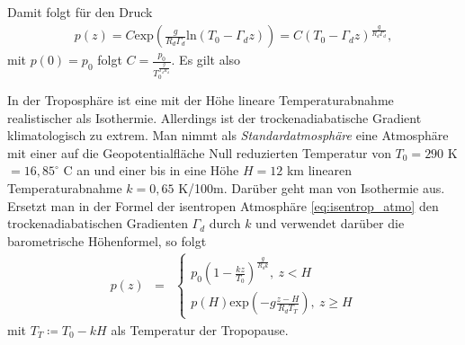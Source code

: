 \documentclass{book}
\renewcommand{\exp}{\text{exp}}
\renewcommand{\ln}{\text{ln}}
\begin{document}
%
Damit folgt für den Druck
%
\begin{eqnarray}
p(z) = C\exp\left(\frac{g}{R_d\Gamma_d}\ln\left(T_0 - \Gamma_d z\right)\right) = C\left(T_0 - \Gamma_d z\right)^{\frac{g}{R_d\Gamma_d}}, 
\end{eqnarray}
%
mit $p(0) = p_0$ folgt $C = \frac{p_0}{T_0^{\frac{g}{\Gamma_d R_d}}}$. Es gilt also
%
\begin{center}
\end{center}
%
In der Troposphäre ist eine mit der Höhe lineare Temperaturabnahme realistischer als Isothermie. Allerdings ist der trockenadiabatische Gradient klimatologisch zu extrem. Man nimmt als \textit{Standardatmosphäre} eine Atmosphäre mit einer auf die Geopotentialfläche Null reduzierten Temperatur von $T_0 = 290$ K $ = 16, 85^\circ$ C an und einer bis in eine Höhe $H = 12$ km linearen Temperaturabnahme $k = 0, 65$ K/100m. Darüber geht man von Isothermie aus. Ersetzt man in der Formel der isentropen Atmosphäre \eqref{eq:isentrop_atmo} den trockenadiabatischen Gradienten $\Gamma_d$ durch $k$ und verwendet darüber die barometrische Höhenformel, so folgt
%
\begin{eqnarray}
p(z) & = & \left\lbrace\begin{array}{c}
p_0\left(1 - \frac{kz}{T_0}\right)^\frac{g}{R_dk}, \:z < H\\
p(H)\exp\left(-g\frac{z - H}{R_dT_T}\right) , \:z\geq H
\end{array}\right.
\end{eqnarray}
%
mit $T_T \coloneqq T_0 - kH$ als Temperatur der Tropopause.
\end{document}
